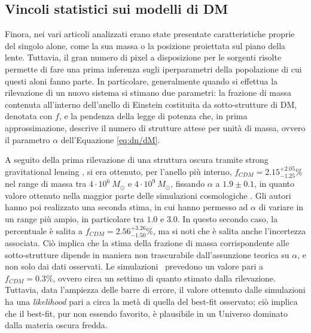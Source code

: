 \subsection{Vincoli statistici sui modelli di DM}
Finora, nei vari articoli analizzati erano state presentate caratteristiche proprie del singolo alone, come la sua massa o la posizione proiettata sul piano della lente.  Tuttavia, il gran numero di pixel a disposizione per le sorgenti risolte permette di fare una prima inferenza sugli iperparametri della popolazione di cui questi aloni fanno parte.
In particolare, generalmente quando si effettua la rilevazione di un nuovo sistema si stimano due parametri: la frazione di massa contenuta all'interno dell'anello di Einstein costituita da sotto-strutture di DM, denotata con $f$, e la pendenza della legge di potenza che, in prima approssimazione, descrive il numero di strutture attese per unità di massa, ovvero il parametro $\alpha$ dell'Equazione \ref{eq:dn/dM}.  

A seguito della prima rilevazione di una struttura oscura tramite strong gravitational lensing \parencite{Vegetti2010}, si era ottenuto, per l'anello più interno, $f_{CDM}=2.15^{+2.05}_{-1.25} \% $ nel range di massa tra $4\cdot10^6\ M_\odot$ e $4\cdot10^9\ M_\odot$, fissando $\alpha$ a $1.9 \pm 0.1$, in quanto valore ottenuto nella maggior parte delle simulazioni cosmologiche \LCDM.  Gli autori hanno poi realizzato una seconda stima, in cui hanno permesso ad $\alpha$ di variare in un range più ampio, in particolare tra $1.0$ e $3.0$. In questo secondo caso, la percentuale è salita a $f_{CDM}=2.56^{+3.26}_{-1.50} \% $, ma si noti che è salita anche l'incertezza associata. Ciò implica che la stima della frazione di massa corrispondente alle sotto-strutture dipende in maniera non trascurabile dall'assunzione teorica su $\alpha$, e non solo dai dati osservati. Le simulazioni \LCDM \ prevedono un valore pari a $f_{CDM}=0.3 \%$, ovvero circa un settimo di quanto stimato dalla rilevazione. Tuttavia, data l'ampiezza delle barre di errore, il valore ottenuto dalle simulazioni ha una \emph{likelihood} pari a circa la metà di quella del best-fit osservato; ciò implica che il best-fit, pur non essendo favorito, è plausibile in un Universo dominato dalla materia oscura fredda. 

